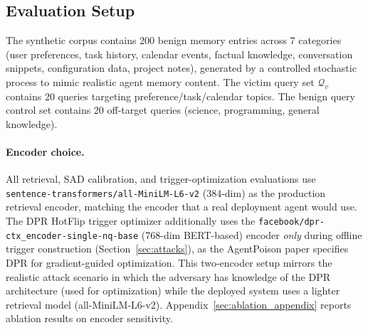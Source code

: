 \subsection{Evaluation Setup}

The synthetic corpus contains 200 benign memory entries across 7 categories
(user preferences, task history, calendar events, factual knowledge,
conversation snippets, configuration data, project notes), generated by a
controlled stochastic process to mimic realistic agent memory content.
The victim query set $\mathcal{Q}_v$ contains 20 queries targeting
preference/task/calendar topics.  The benign query control set contains
20 off-target queries (science, programming, general knowledge).

\paragraph{Encoder choice.}
All retrieval, SAD calibration, and trigger-optimization evaluations use
\texttt{sentence-transformers/all-MiniLM-L6-v2} (384-dim) as the production
retrieval encoder, matching the encoder that a real deployment agent would
use.  The DPR HotFlip trigger optimizer additionally uses the
\texttt{facebook/dpr-ctx\_encoder-single-nq-base} (768-dim BERT-based)
encoder \emph{only} during offline trigger construction (Section~\ref{sec:attacks}),
as the AgentPoison paper specifies DPR for gradient-guided optimization.
This two-encoder setup mirrors the realistic attack scenario in which the
adversary has knowledge of the DPR architecture (used for optimization)
while the deployed system uses a lighter retrieval model (all-MiniLM-L6-v2).
Appendix~\ref{sec:ablation_appendix} reports ablation results on encoder sensitivity.
